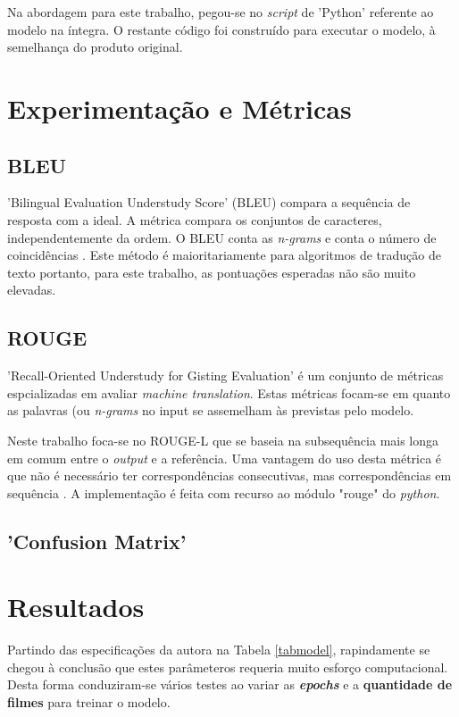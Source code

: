 \documentclass{article}
\begin{document}
Na abordagem para este trabalho, pegou-se no \textit{script} de 'Python' referente ao modelo na íntegra. O restante código foi construído para executar o modelo, à semelhança do produto original.

\section{Experimentação e Métricas}
\label{metricas}
\subsection{BLEU}
'Bilingual Evaluation Understudy Score' (BLEU) compara a sequência de resposta com a ideal. A métrica compara os conjuntos de caracteres, independentemente da ordem. O BLEU conta as \textit{n-grams} e conta o número de coincidências \cite{papineni2002bleu}. Este método é maioritariamente para algoritmos de tradução de texto portanto, para este trabalho, as pontuações esperadas não são muito elevadas. 
\subsection{ROUGE}
'Recall-Oriented Understudy for Gisting Evaluation' é um conjunto de métricas espcializadas em avaliar \textit{machine translation}. Estas métricas focam-se em quanto as palavras (ou \textit{n-grams} no input se assemelham às previstas pelo modelo.

Neste trabalho foca-se no ROUGE-L que se baseia na subsequência mais longa em comum entre o \textit{output} e a referência. Uma vantagem do uso desta métrica é que não é necessário ter correspondências consecutivas, mas correspondências em sequência \cite{rouge}. A implementação é feita com recurso ao módulo "rouge" do \textit{python}.

\subsection{'Confusion Matrix'}





\section{Resultados}

Partindo das especificações da autora na Tabela \ref{tabmodel}, rapindamente se chegou à conclusão que estes parâmeteros requeria muito esforço computacional. Desta forma conduziram-se vários testes ao variar as \textbf{\textit{epochs}} e a \textbf{quantidade de filmes} para treinar o modelo.
\end{document}
